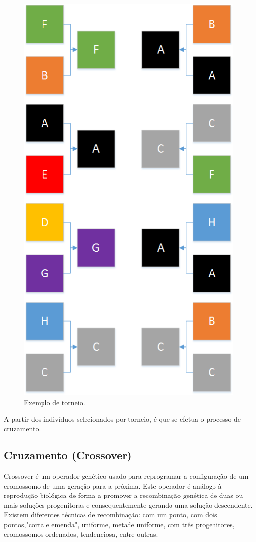 \documentclass[twoside]{article}
\begin{document}
\begin{multicols}{2}
\begin{figure}[H]
\label{fig:torneio}
  \caption{Exemplo de torneio.}
  \centering
    \includegraphics[scale = 0.47]{torneio.png}
\end{figure}

A partir dos indivíduos selecionados por torneio, é que se efetua o processo de cruzamento.

\subsection{Cruzamento (Crossover)}
Crossover é um operador genético usado para reprogramar a configuração de um cromossomo de uma geração para a próxima. Este operador é análogo à reprodução biológica de forma a promover a recombinação genética de duas ou mais soluções progenitoras e consequentemente gerando uma solução descendente. Existem diferentes técnicas de recombinação: com um ponto, com dois pontos,"corta e emenda", uniforme, metade uniforme, com três progenitores, cromossomos ordenados, tendenciosa, entre outras.


\end{multicols}
\end{document}

